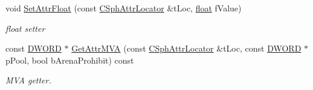 \begin{DoxyCompactItemize}
void \hyperlink{classCSphMatch_ae7daf2a466cef6c5c101dd87c3ff5001}{Set\-Attr\-Float} (const \hyperlink{structCSphAttrLocator}{C\-Sph\-Attr\-Locator} \&t\-Loc, \hyperlink{sphinxexpr_8cpp_a0e0d0739f7035f18f949c2db2c6759ec}{float} f\-Value)
\begin{DoxyCompactList}\small\item\em float setter \end{DoxyCompactList}\item 
const \hyperlink{sphinxstd_8h_a798af1e30bc65f319c1a246cecf59e39}{D\-W\-O\-R\-D} $\ast$ \hyperlink{classCSphMatch_ac7e247cae8b05ab1f559d4f528e9ec4d}{Get\-Attr\-M\-V\-A} (const \hyperlink{structCSphAttrLocator}{C\-Sph\-Attr\-Locator} \&t\-Loc, const \hyperlink{sphinxstd_8h_a798af1e30bc65f319c1a246cecf59e39}{D\-W\-O\-R\-D} $\ast$p\-Pool, bool b\-Arena\-Prohibit) const 
\begin{DoxyCompactList}\small\item\em M\-V\-A getter. \end{DoxyCompactList}\end{DoxyCompactItemize}
